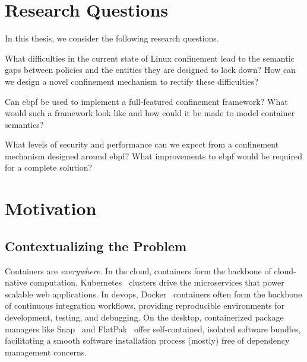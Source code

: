 \section{Research Questions}%
\label{s:intro-rqs}

In this thesis, we consider the following research questions.

\begin{rqenum}
  \item \label{rq1} What difficulties in the current state of Linux confinement lead to the semantic
        gaps between policies and the entities they are designed to lock down? How can we design
        a novel confinement mechanism to rectify these difficulties?

  \item \label{rq2} Can \gls{ebpf} be used to implement a full-featured confinement framework?
        What would such a framework look like and how could it be made to model container semantics?

  \item \label{rq3} What levels of security and performance can we expect from a confinement mechanism
        designed around \gls{ebpf}? What improvements to \gls{ebpf} would be required for
        a complete solution?
\end{rqenum}

\section{Motivation}%
\label{s:motivation}

\subsection{Contextualizing the Problem}%
\label{ss:contextualizing-the-problem}

Containers are \textit{everywhere}. In the cloud, containers form the backbone of
cloud-native computation. Kubernetes~\cite{kubernetes} clusters drive the microservices
that power scalable web applications. In devops, Docker~\cite{docker_security} containers
often form the backbone of continuous integration workflows, providing reproducible
environments for development, testing, and debugging. On the desktop, containerized
package managers like Snap~\cite{snap} and FlatPak~\cite{flatpak} offer self-contained,
isolated software bundles, facilitating a smooth software installation process (mostly)
free of dependency management concerns.


